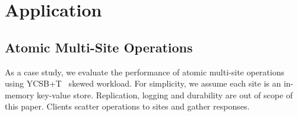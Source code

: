 \section{Application}
\label{sec:application}

\subsection{Atomic Multi-Site Operations}
\label{subsec:eval-kvs}

As a case study, we evaluate the performance of atomic multi-site operations using YCSB+T~\cite{dey2014ycsbt} skewed workload.
For simplicity, we assume each site is an in-memory key-value store.
Replication, logging and durability are out of scope of this paper.
Clients scatter operations to sites and gather responses.





